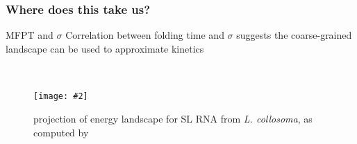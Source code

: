 \documentclass{beamer}
\newcommand{\slidefigure}[2][1]{\centering\texttt{[image: \#2]}}
\begin{document}
\begin{frame}
  \frametitle{Where does this take us?}
  \begin{block}
    {MFPT and $\sigma$}
    Correlation between folding time and $\sigma$ suggests the coarse-grained landscape can be used to approximate kinetics
  \end{block}
\end{frame}

\begin{frame}
  \frametitle{\ffttwo}

  \begin{columns}

    \begin{figure}
      \centering \slidefigure{Figures/FFTbor2D/ffttwoProbContour} \caption{\twoD projection of energy landscape for SL RNA from {\em L. collosoma}, as computed by \ffttwo}
    \end{figure}
  \end{columns}
\end{frame}
\end{document}
